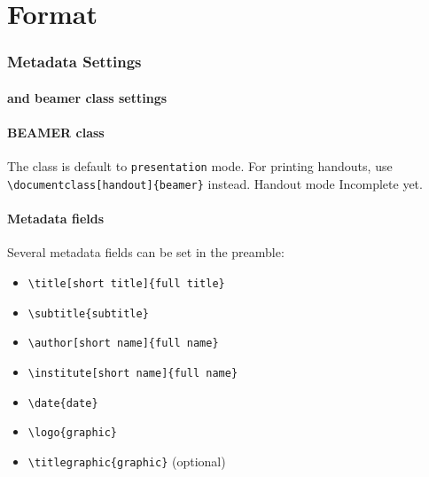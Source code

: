 \section{Format} 

\begin{frame}
  \frametitle{Metadata Settings}
  \framesubtitle{and beamer class settings}
  
  \paragraph{BEAMER class}
  The class is default to \Verb|presentation| mode. 
  For printing handouts, use \Verb|\documentclass[handout]{beamer}| instead. 
  \alert{Handout mode Incomplete yet.}

  \paragraph{Metadata fields}
  Several metadata fields can be set in the preamble:
  \begin{itemize}
    \item \Verb|\title[short title]{full title}|
    \item \Verb|\subtitle{subtitle}|
    \item \Verb|\author[short name]{full name}|
    \item \Verb|\institute[short name]{full name}|
    \item \Verb|\date{date}|
    \item \Verb|\logo{graphic}|
    \item \Verb|\titlegraphic{graphic}| (optional)
  \end{itemize}
\end{frame}

